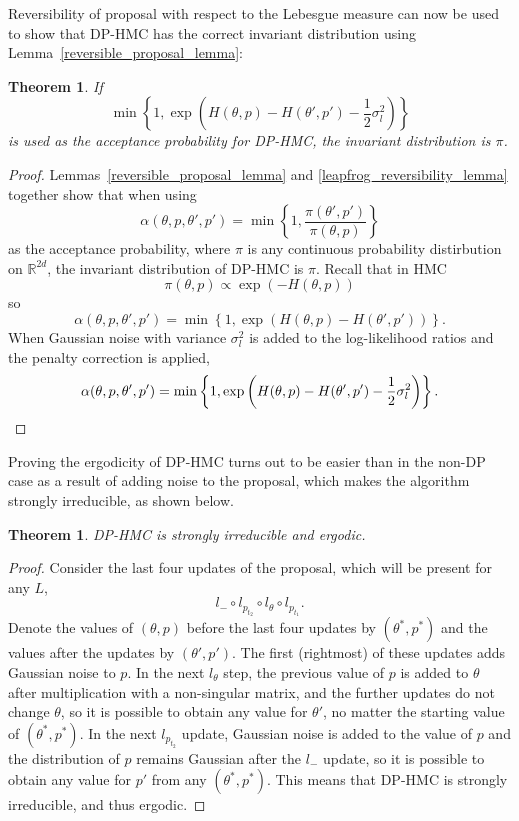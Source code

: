 \documentclass[english,twoside,openright]{HYgraduMLDS}
\newtheorem{theorem}[lemma]{Theorem}
\newcommand{\R}{\mathbb{R}}
\begin{document}
Reversibility of proposal with respect to the Lebesgue measure can now be
used to show that DP-HMC has the correct invariant distribution using
Lemma~\ref{reversible_proposal_lemma}:
\begin{theorem}\label{dp_hmc_invariant_theorem}
  If
  \[
    \min\left\{1, \exp\left(H(\theta, p)
        - H(\theta', p') - \frac{1}{2}\sigma_{l}^{2}\right)\right\}
  \]
  is used as the acceptance probability for DP-HMC, the invariant distribution
  is \(\pi\).
\end{theorem}
\begin{proof}
Lemmas~\ref{reversible_proposal_lemma} and \ref{leapfrog_reversibility_lemma}
together show that when using
\[
  \alpha(\theta, p, \theta', p')
  = \min\left\{1, \frac{\pi(\theta', p')}{\pi(\theta, p)}\right\}
\]
as the acceptance probability, where \(\pi\) is any continuous
probability distirbution on \(\R^{2d}\), the invariant distribution
of DP-HMC is \(\pi\).
Recall that in HMC
\[
  \pi(\theta, p) \propto \exp(-H(\theta, p))
\]
so
\[
  \alpha(\theta, p, \theta', p')
  = \min\left\{1, \exp\left(H(\theta, p) - H(\theta', p')\right)\right\}.
\]
When Gaussian noise with variance \(\sigma_{l}^{2}\) is added to the
log-likelihood ratios and the penalty correction is applied,
  \[
    \alpha(\theta, p, \theta', p')
    = \min\left\{1, \exp\left(H(\theta, p)
        - H(\theta', p') - \frac{1}{2}\sigma_{l}^{2}\right)\right\}.
    \qedhere
  \]
\end{proof}

Proving the ergodicity of DP-HMC turns out to be easier than in the
non-DP case as a result of adding noise to the proposal, which makes the
algorithm strongly irreducible, as shown below.
\begin{theorem}\label{dp_hmc_ergodicity_theorem}
	DP-HMC is strongly irreducible and ergodic.
\end{theorem}
\begin{proof}
  Consider the last four updates of the proposal, which will be present for any
  \(L\),
  \[
    l_{-}\circ l_{p_{t_{2}}}\circ l_{\theta}\circ l_{p_{t_{1}}}.
  \]
  Denote the values of \((\theta, p)\) before the last four updates by \((\theta^{*}, p^{*})\) and
  the values after the updates by \((\theta', p')\).
  The first (rightmost) of these updates adds Gaussian noise to \(p\). In the next
  \(l_{\theta}\) step, the previous value of \(p\) is added to \(\theta\)
  after multiplication with a non-singular matrix, and the further updates
  do not change \(\theta\), so it is possible
  to obtain any value for \(\theta'\), no matter the starting value of
  \((\theta^{*}, p^{*})\). In the next \(l_{p_{t_{2}}}\) update, Gaussian noise is
  added to the value of \(p\) and the distribution of \(p\) remains Gaussian
  after the \(l_{-}\) update, so it is possible to obtain any value
  for \(p'\) from any \((\theta^{*}, p^{*})\). This means that
  DP-HMC is strongly irreducible, and thus ergodic.
\end{proof}
\end{document}
